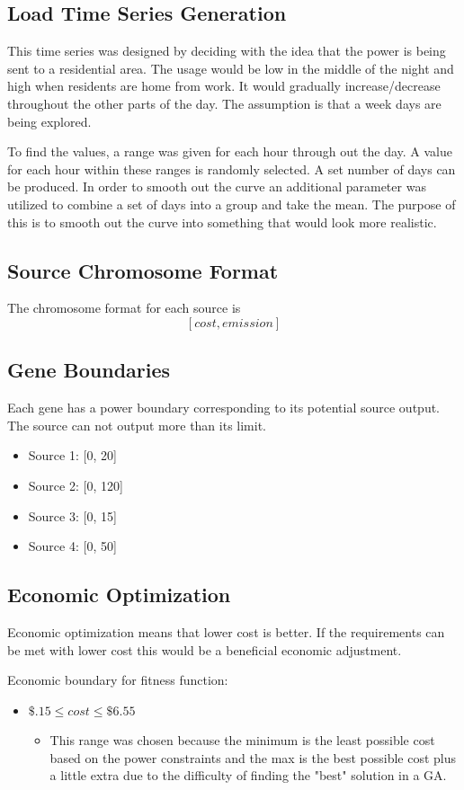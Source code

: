 \documentclass{article}
\begin{document}
    \subsection{Load Time Series Generation}
    This time series was designed by deciding with the idea that the power is being sent to a residential area.  The usage would be low in the middle
    of the night and high when residents are home from work.  It would gradually
    increase/decrease throughout the other parts of the day.  The assumption
    is that a week days are being explored.

    To find the values, a range was given for each hour through out the day.
    A value for each hour within these ranges is randomly selected.  A set
    number of days can be produced.  In order to smooth out the curve an additional parameter was utilized to combine a set of days into a group and take the mean.  The purpose of this is to smooth out the curve into something that would look more realistic.

    \subsection{Source Chromosome Format}
    The chromosome format for each source is
    \[[cost, emission]\]

    \subsection{Gene Boundaries}
    Each gene has a power boundary corresponding to its potential source output.  The source can not output more than its limit.
    \begin{itemize}
        \item Source 1: [0, 20]
        \item Source 2: [0, 120]
        \item Source 3: [0, 15]
        \item Source 4: [0, 50]
    \end{itemize}

    \newpage
    \subsection{Economic Optimization}
    Economic optimization means that lower cost is better.  If the requirements can be met with lower cost this would be a beneficial economic adjustment.

    Economic boundary for fitness function:
    \begin{itemize}
        \item \(\$.15 \leq cost \leq \$6.55\)
        \begin{itemize}
            \item This range was chosen because the minimum is the least possible cost based on the power constraints and the max is the best possible cost plus a little extra due to the difficulty of finding the "best" solution in a GA.
        \end{itemize}
    \end{itemize}
\end{document}
